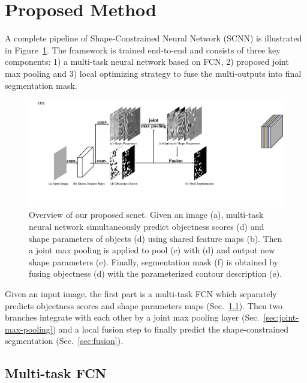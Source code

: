 \section{Proposed Method}
\label{sec:method}

A complete pipeline of Shape-Constrained Neural Network (SCNN) is illustrated in Figure~\ref{FigSCNN}.
The framework is trained end-to-end and consists of three key components:
1) a multi-task neural network based on FCN,
2) proposed joint max pooling and
3) local optimizing strategy to fuse the multi-outputs into final segmentation mask.
%
\begin{figure}
    \begin{center}
        \includegraphics[width=6.8in]{figures/FigSCNN.pdf}
    \end{center}
    \caption{Overview of our proposed scnet. Given an image (a), multi-task neural network simultaneously predict objectness scores (d) and shape parameters of objects (d) using shared feature maps (b).
    Then a joint max pooling is applied to pool (c) with (d) and output new shape parameters (e).
    Finally, segmentation mask (f) is obtained by fusing objectness (d) with the parameterized contour description (e).}
    \label{FigSCNN}
\end{figure}

Given an input image, the first part is a multi-task FCN which separately predicts objectness scores and shape parameters maps (Sec.~\ref{sec:multi-task-fcn}).
Then two branches integrate with each other by a joint max pooling layer (Sec.~\ref{sec:joint-max-pooling}) and a local fusion step to finally predict the shape-constrained segmentation (Sec.~\ref{sec:fusion}).

\subsection{Multi-task FCN}
\label{sec:multi-task-fcn}

